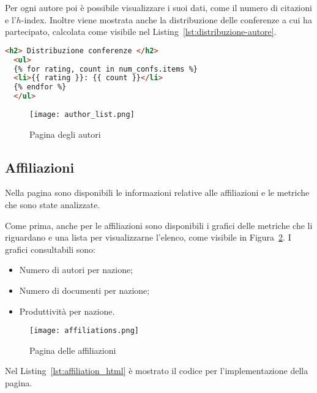 Per ogni autore poi è possibile visualizzare i suoi dati, come il numero di citazioni e l'$h$-index. Inoltre viene mostrata anche la distribuzione delle conferenze a cui ha partecipato, calcolata come visibile nel Listing~\ref{lst:distribuzione-autore}.

\begin{lstlisting}[language=html, caption=Estratto di \texttt{template/author\_info.html per la visualizzazione della distribuzione delle conferenze a cui l'autore partecipa}, label=lst:distribuzione-autore]
  <h2> Distribuzione conferenze </h2>
  <ul>
  {% for rating, count in num_confs.items %}
  <li>{{ rating }}: {{ count }}</li>
  {% endfor %}
  </ul>  

\end{lstlisting}

\begin{figure}
  \centering
  \texttt{[image: author\_list.png]}
  \caption{Pagina degli autori}
  \label{fig:lista-autori}
\end{figure}



\subsection{Affiliazioni}

Nella pagina sono disponibili le informazioni relative alle affiliazioni e le metriche che sono state analizzate.

Come prima, anche per le affiliazioni sono disponibili i grafici delle metriche che li riguardano e una lista per visualizzarne l'elenco, come visibile in Figura~\ref{fig:affiliations}. I grafici consultabili sono:
\begin{itemize}
  \item Numero di autori per nazione;
  \item Numero di documenti per nazione;
  \item Produttività per nazione.
\end{itemize}

\begin{figure}
  \centering
  \texttt{[image: affiliations.png]}
  \caption{Pagina delle affiliazioni}
  \label{fig:affiliations}
\end{figure}

Nel Listing~\ref{lst:affiliation_html} è mostrato il codice per l'implementazione della pagina. 

